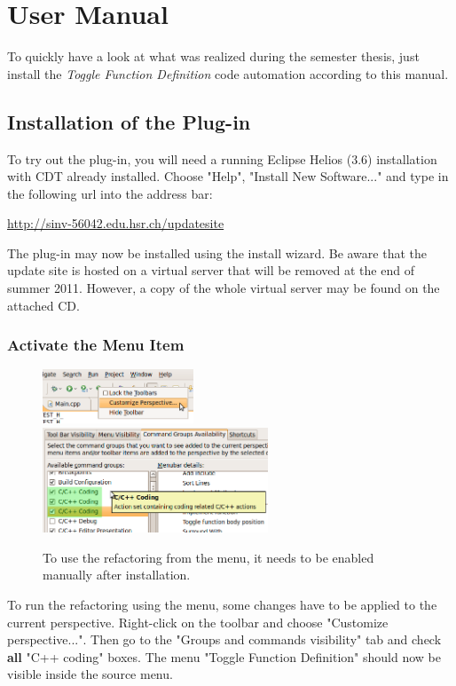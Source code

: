 \chapter{User Manual}
\thispagestyle{fancy}

To quickly have a look at what was realized during the semester thesis, just 
install the \textit{Toggle Function Definition} code automation according to 
this manual.

\section{Installation of the Plug-in}

To try out the plug-in, you will need a running Eclipse Helios (3.6) installation with CDT already installed. Choose "Help", "Install New Software..." and type in the following url into the address bar:

\url{http://sinv-56042.edu.hsr.ch/updatesite}

The plug-in may now be installed using the install wizard. Be aware that the 
update site is hosted on a virtual server that will be removed at the end of 
summer 2011. However, a copy of the whole virtual server may be found on the 
attached CD.

\subsection{Activate the Menu Item}

\begin{figure}[h]
\includegraphics[width=0.4\textwidth]{images/customizeperspective.png}
\includegraphics[width=0.6\textwidth]{images/commandgroups.png}
\caption{To use the refactoring from the menu, it needs to be enabled manually 
after installation.}
\label{showMenu}
\end{figure}
\label{cmdGroup}
To run the refactoring using the menu, some changes have to be applied to the 
current perspective. Right-click on the toolbar and choose 
"Customize perspective...". Then go to the "Groups and commands visibility" tab 
and check \textbf{all} "C++ coding" boxes. The menu "Toggle Function Definition" 
should now be visible inside the source menu.

